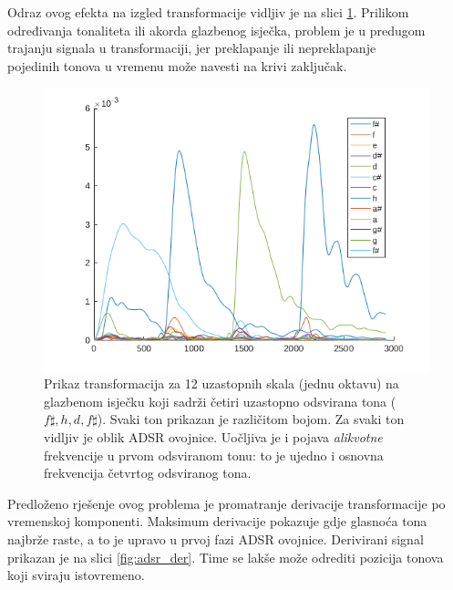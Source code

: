 \documentclass[a4paper, 11pt, twocolumn]{article}
\begin{document}
Odraz ovog efekta na izgled transformacije vidljiv je na slici \ref{fig:adsr_anomalija}.
Prilikom određivanja tonaliteta ili akorda glazbenog isječka, problem je u predugom trajanju signala u transformaciji, jer preklapanje ili nepreklapanje \\
pojedinih tonova u vremenu može navesti na krivi zaključak.

\begin{figure}[htb]
  \includegraphics[width=\linewidth]{adsr_anomalija}
  \caption{Prikaz transformacija za 12 uzastopnih skala (jednu oktavu) na glazbenom isječku koji sadrži četiri uzastopno odsvirana tona ($f\sharp, h, d, f\sharp$). Svaki ton prikazan je različitom bojom. Za svaki ton vidljiv je oblik ADSR ovojnice. Uočljiva je i pojava \textit{alikvotne} frekvencije u prvom odsviranom tonu: to je ujedno i osnovna frekvencija četvrtog odsviranog tona.}
  \label{fig:adsr_anomalija}
\end{figure}

Predloženo rješenje ovog problema je promatranje derivacije transformacije po vremenskoj komponenti.
Maksimum derivacije pokazuje gdje glasnoća tona najbrže raste, a to je upravo u prvoj fazi ADSR ovojnice.
Derivirani signal prikazan je na slici \ref{fig:adsr_der}.
Time se lakše može odrediti pozicija tonova koji sviraju istovremeno.
\end{document}

